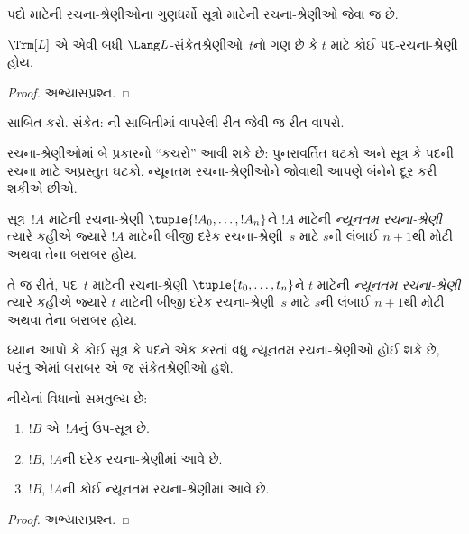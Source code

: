 પદો માટેની રચના-શ્રેણીઓના ગુણધર્મો સૂત્રો માટેની
રચના-શ્રેણીઓ જેવા જ છે.

\begin{prop}
$\Trm[L]$ એ એવી બધી $\Lang L$-સંકેતશ્રેણીઓ~$t$નો ગણ છે કે
$t$ માટે કોઈ પદ-રચના-શ્રેણી હોય.
\end{prop}

\begin{proof}
અભ્યાસપ્રશ્ન.
\end{proof}

\begin{prob}
 સાબિત કરો.
સંકેત: ની સાબિતીમાં
વાપરેલી રીત જેવી જ રીત વાપરો.
\end{prob}

રચના-શ્રેણીઓમાં બે પ્રકારનો ``કચરો'' આવી શકે છે: પુનરાવર્તિત ઘટકો
અને સૂત્ર કે પદની રચના માટે અપ્રસ્તુત ઘટકો. ન્યૂનતમ રચના-શ્રેણીઓને
જોવાથી આપણે બંનેને દૂર કરી શકીએ છીએ.

\begin{defn}
સૂત્ર~$!A$ માટેની રચના-શ્રેણી $\tuple{!A_0, \ldots, !A_n}$ને
$!A$ માટેની \emph{ન્યૂનતમ રચના-શ્રેણી} ત્યારે કહીએ જ્યારે $!A$ માટેની
બીજી દરેક રચના-શ્રેણી~$s$ માટે $s$ની લંબાઈ $n+1$થી મોટી અથવા તેના
બરાબર હોય.

તે જ રીતે, પદ~$t$ માટેની રચના-શ્રેણી $\tuple{t_0, \ldots, t_n}$ને
$t$ માટેની \emph{ન્યૂનતમ રચના-શ્રેણી} ત્યારે કહીએ જ્યારે $t$ માટેની
બીજી દરેક રચના-શ્રેણી~$s$ માટે $s$ની લંબાઈ $n+1$થી મોટી અથવા તેના
બરાબર હોય.
\end{defn}

ધ્યાન આપો કે કોઈ સૂત્ર કે પદને એક કરતાં વધુ ન્યૂનતમ રચના-શ્રેણીઓ
હોઈ શકે છે, પરંતુ એમાં બરાબર એ જ સંકેતશ્રેણીઓ હશે.

\begin{prop}
નીચેનાં વિધાનો સમતુલ્ય છે:
\begin{enumerate}
    \item $!B$ એ~$!A$નું ઉપ-સૂત્ર છે.
    \item $!B$, $!A$ની દરેક રચના-શ્રેણીમાં આવે છે.
    \item $!B$, $!A$ની કોઈ ન્યૂનતમ રચના-શ્રેણીમાં આવે છે.
\end{enumerate}
\end{prop}

\begin{proof}
અભ્યાસપ્રશ્ન.
\end{proof}

